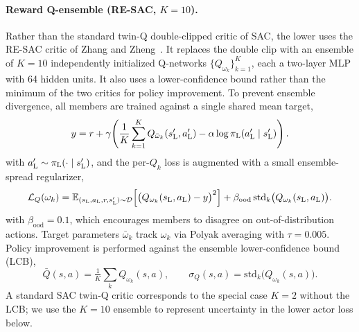 \paragraph{Reward Q-ensemble (RE-SAC, $K{=}10$).}
Rather than the standard twin-Q double-clipped critic of SAC, the lower uses the RE-SAC critic of Zhang and Zheng~\citep{resac2026}. It replaces the double clip with an ensemble of $K{=}10$ independently initialized Q-networks $\{Q_{\omega_k}\}_{k=1}^{K}$, each a two-layer MLP with 64 hidden units. It also uses a lower-confidence bound rather than the minimum of the two critics for policy improvement. To prevent ensemble divergence, all members are trained against a single shared mean target,
{\footnotesize
\begin{equation}
\label{eq:lower_q_target}
    y = r + \gamma\!\left(\frac{1}{K}\sum_{k=1}^{K}Q_{\bar{\omega}_k}(s_{\mathrm{L}}',a_{\mathrm{L}}') - \alpha\log\pi_{\mathrm{L}}(a_{\mathrm{L}}'\mid s_{\mathrm{L}}')\right).
\end{equation}
}
with $a_{\mathrm{L}}' \sim \pi_{\mathrm{L}}(\cdot \mid s_{\mathrm{L}}')$,
and the per-$Q_k$ loss is augmented with a small ensemble-spread regularizer,
{\footnotesize
\begin{equation}
\label{eq:lower_q_loss}
    \mathcal{L}_Q(\omega_k) = \mathbb{E}_{(s_{\mathrm{L}},a_{\mathrm{L}},r,s_{\mathrm{L}}')\sim\mathcal{D}}\!\left[\bigl(Q_{\omega_k}(s_{\mathrm{L}},a_{\mathrm{L}})-y\bigr)^2\right] + \beta_{\mathrm{ood}}\,\mathrm{std}_k\bigl(Q_{\omega_k}(s_{\mathrm{L}},a_{\mathrm{L}})\bigr).
\end{equation}
}
with $\beta_{\mathrm{ood}} = 0.1$,
which encourages members to disagree on out-of-distribution actions. Target parameters $\bar{\omega}_k$ track $\omega_k$ via Polyak averaging with $\tau = 0.005$. Policy improvement is performed against the ensemble lower-confidence bound (LCB),
\begin{equation}
\label{eq:lower_lcb}
    \bar{Q}(s, a) = \tfrac{1}{K}\sum_{k} Q_{\omega_k}(s, a),\qquad \sigma_Q(s, a) = \mathrm{std}_k\bigl(Q_{\omega_k}(s, a)\bigr).
\end{equation}
A standard SAC twin-Q critic corresponds to the special case $K{=}2$ without the LCB; we use the $K{=}10$ ensemble to represent uncertainty in the lower actor loss below.

